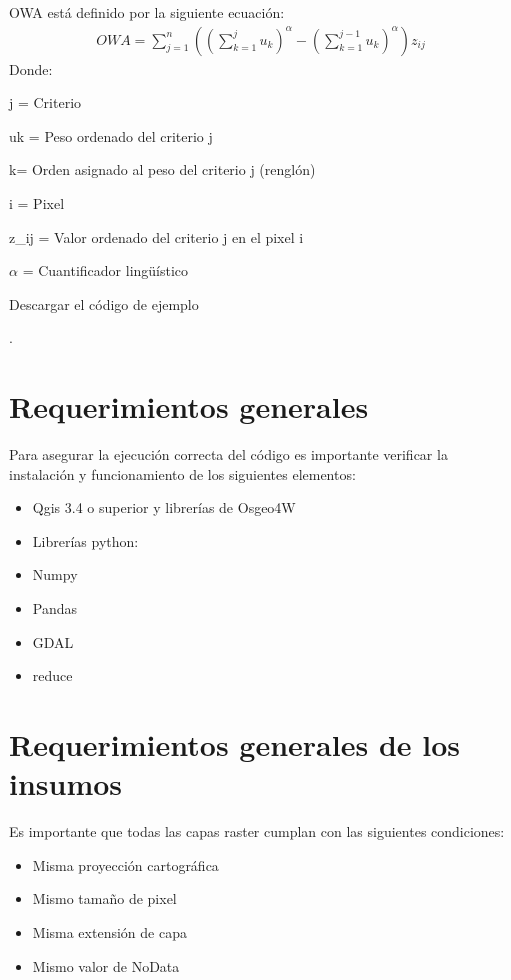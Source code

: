 \documentclass[letterpaper,10pt,spanish]{sphinxmanual}
\begin{document}
OWA está definido por la siguiente ecuación:
\begin{equation*}
\begin{split}OWA=\sum_{j=1}^{n}\left (\left( \sum_{k=1}^{j}u_{k}\right )^{\alpha} - \left ( \sum_{k=1}^{j-1}u_{k}\right )^{\alpha} \right )z_{ij}\end{split}
\end{equation*}
Donde:

j = Criterio

uk = Peso ordenado del criterio j

k= Orden asignado al peso del criterio j (renglón)

i = Pixel

z\_ij = Valor ordenado del criterio j en el pixel i

\(\alpha\) = Cuantificador lingüístico

Descargar el código de ejemplo

.


\section{Requerimientos generales}
\label{\detokenize{owa:requerimientos-generales}}
Para asegurar la ejecución correcta del código es importante
verificar la instalación y funcionamiento de los siguientes elementos:
\begin{itemize}
\item {} 
Qgis 3.4 o superior y librerías de Osgeo4W

\item {} 
Librerías python:

\end{itemize}
\begin{itemize}
\item {} 
Numpy

\item {} 
Pandas

\item {} 
GDAL

\item {} 
reduce

\end{itemize}


\section{Requerimientos generales de los insumos}
\label{\detokenize{owa:requerimientos-generales-de-los-insumos}}
Es importante que todas las capas raster cumplan con las siguientes condiciones:
\begin{itemize}
\item {} 
Misma proyección cartográfica

\item {} 
Mismo tamaño de pixel

\item {} 
Misma extensión de capa

\item {} 
Mismo valor de NoData

\end{itemize}
\end{document}
